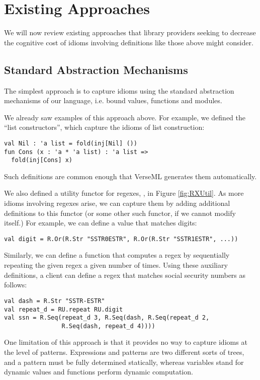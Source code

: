 \section{Existing Approaches}\label{sec:existing-approaches}
We will now review existing approaches that library providers seeking to decrease the cognitive cost of idioms involving definitions like those above might consider. 

\subsection{Standard Abstraction Mechanisms}
The simplest approach is to capture idioms using the standard abstraction mechanisms of our 
language, i.e. bound values, functions and modules. 

We already saw examples of this approach above. For example, we defined the ``list constructors'', which capture the idioms of list construction:
\begin{lstlisting}[numbers=none]
val Nil : 'a list = fold(inj[Nil] ())
fun Cons (x : 'a * 'a list) : 'a list => 
  fold(inj[Cons] x)
\end{lstlisting} 
Such definitions are common enough that VerseML generates them automatically.

We also defined a utility functor for regexes, , in Figure \ref{fig:RXUtil}. As more idioms involving regexes arise, we can capture them by adding additional definitions to this functor (or some other such functor, if we cannot modify  itself.) For example, we can define a value that matches digits:
\begin{lstlisting}[numbers=none]
val digit = R.Or(R.Str "SSTR0ESTR", R.Or(R.Str "SSTR1ESTR", ...))
\end{lstlisting}
Similarly, we can define a function  that computes a regex by sequentially repeating the given regex a given number of times. Using these auxiliary definitions, a client can define a regex that matches social security numbers as follows:
\begin{lstlisting}[numbers=none]
val dash = R.Str "SSTR-ESTR"
val repeat_d = RU.repeat RU.digit
val ssn = R.Seq(repeat_d 3, R.Seq(dash, R.Seq(repeat_d 2, 
                R.Seq(dash, repeat_d 4))))
\end{lstlisting}

One limitation of this approach is that it provides no way to capture idioms at the level of patterns. Expressions and patterns are two different sorts of trees, and a pattern must be fully determined statically, whereas variables stand for dynamic values and functions perform dynamic computation.

